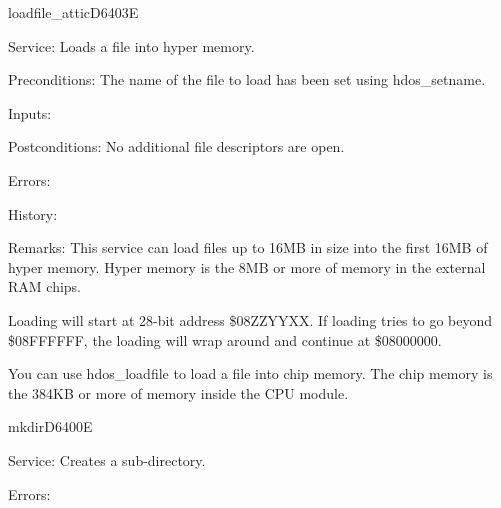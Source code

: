 \newpage
\begin{hyppotrap}{loadfile\_attic}{D640}{3E}
\item [Service:]
  Loads a file into hyper memory.
\item [Preconditions:]
  The name of the file to load has been set using hdos\_setname.
\item [Inputs:]
\item [Postconditions:]
  No additional file descriptors are open.
\item [Errors:]
\item [History:]
\item [Remarks:]
  This service can load files up to 16MB in size into the first 16MB of hyper
  memory. Hyper memory is the 8MB or more of memory in the external RAM chips.

  Loading will start at 28-bit address \$08ZZYYXX. If loading tries to go beyond
  \$08FFFFFF, the loading will wrap around and continue at \$08000000.

  You can use hdos\_loadfile to load a file into chip memory. The chip memory is
  the 384KB or more of memory inside the CPU module.
\end{hyppotrap}


\newpage
\begin{hyppotrap}{mkdir}{D640}{0E}
\item [Service:]
  Creates a sub-directory.
\item [Errors:]
\notimplemented
\end{hyppotrap}


